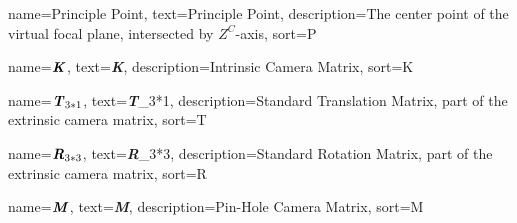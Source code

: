 %
{%
  name={Principle Point},
  text={Principle Point},
  description={The center point of the virtual focal plane, intersected by $Z^C$-axis},
  sort={P}
}

%
{%
  name={$\textbf{\textit{K}}$},
  text={\textbf{\textit{K}}},
  description={Intrinsic Camera Matrix},
  sort={K}
}


%
{%
  name={$\textbf{\textit{T}}_{3*1}$},
  text={\textbf{\textit{T}}_{3*1}},
  description={Standard Translation Matrix, part of the extrinsic camera matrix},
  sort={T}
}

%
{%
  name={$\textbf{\textit{R}}_{3*3}$},
  text={\textbf{\textit{R}}_{3*3}},
  description={Standard Rotation Matrix, part of the extrinsic camera matrix},
  sort={R}
}

%
{%
  name={$\textbf{\textit{M}}$},
  text={\textbf{\textit{M}}},
  description={Pin-Hole Camera Matrix},
  sort={M}
}












